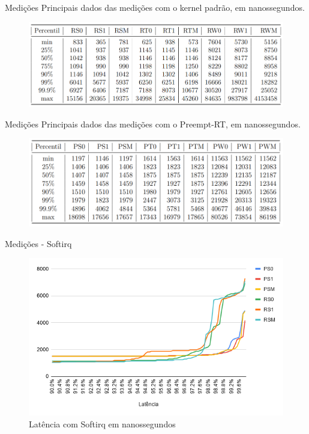 \documentclass[12pt,brazil]{beamer}
\begin{document}
\begin{frame}{Medições}
Principais dados das medições com o kernel padrão, em nanossegundos.
    \begin{figure}[!htb]
        \centering
        \includegraphics[width=\textwidth]{figures/tabela_r.png}
        \label{table:rasp}
    \end{figure}

\end{frame}

\begin{frame}{Medições}
Principais dados das medições com o Preempt-RT, em nanossegundos.
    \begin{figure}[!htb]
        \centering
        \includegraphics[width=\textwidth]{figures/tabela_p.png}
        \label{table:rasp}
    \end{figure}

\end{frame}

\begin{frame}{Medições - Softirq}
    
    \begin{figure}[!htb]
        \centering
        \includegraphics[width=\textwidth]{figures/softirq.png}
        \caption*{Latência com Softirq em nanossegundos}
        \label{grafico:softirq}
    \end{figure}

\end{frame}
\end{document}
